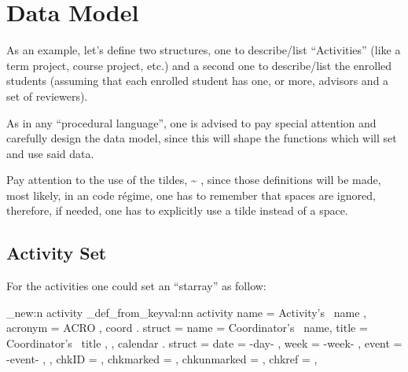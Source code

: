 \documentclass[10pt]{article}
\begin{document}

\section{Data Model}\label{DataModel}
As an example, let's define two structures, one to describe/list ``Activities'' (like a term project, course project, etc.)  and a second one to describe/list the enrolled students (assuming that each enrolled student has one, or more, advisors and a set of reviewers).
\begin{tsremark}
As in any ``procedural language'', one is advised to pay special attention and carefully design the data model, since this will shape the functions which will set and use said data.
\end{tsremark}
\begin{tsremark}
  Pay attention to the use of the tildes,  \~{} , since those definitions will be made, most likely, in an  code régime, one has to remember that spaces are ignored, therefore, if needed, one has to explicitly use a tilde instead of a space.
\end{tsremark}

\subsection{Activity Set}
For the activities one could set an ``starray'' as follow:


\begin{codestore}
\starray_new:n {activity}
\starray_def_from_keyval:nn {activity} {
    name = Activity's~ name ,
    acronym = ACRO ,
    coord . struct =  {
        name = Coordinator's~ name,
        title = Coordinator's~ title ,
      } ,
    calendar . struct = {
        date = {-day-} ,
        week = {-week-} ,
        event = {-event-} ,
      } ,
    chkID = ,        %
    chkmarked = ,    %
    chkunmarked = ,  %
    chkref = ,       %
  }
\end{codestore}
\end{document}
